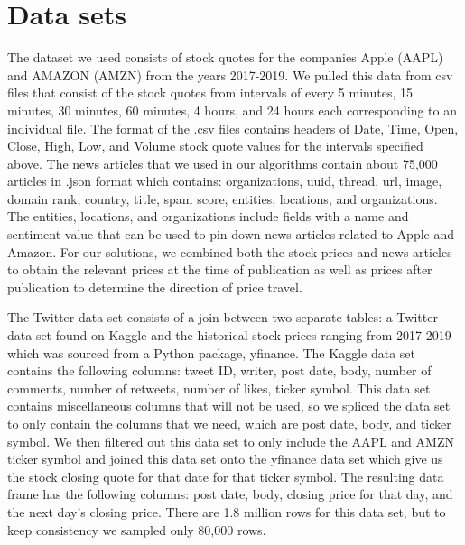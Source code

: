 \documentclass[conference]{IEEEtran}
\begin{document}
\section{Data sets}
The dataset we used consists of stock quotes for the companies Apple (AAPL) and AMAZON (AMZN) from the years 2017-2019. We pulled this data from csv files that consist of the stock quotes from intervals of every 5 minutes, 15 minutes, 30 minutes, 60 minutes, 4 hours, and 24 hours each corresponding to an individual file. The format of the .csv files contains headers of Date, Time, Open, Close, High, Low, and Volume stock quote values for the intervals specified above. The news articles that we used in our algorithms contain about 75,000 articles in .json format which contains: organizations, uuid, thread, url, image, domain rank, country, title, spam score, entities, locations, and organizations. The entities, locations, and organizations include fields with a name and sentiment value that can be used to pin down news articles related to Apple and Amazon.
For our solutions, we combined both the stock prices and news articles to obtain the relevant prices at the time of publication as well as prices after publication to determine the direction of price travel.

The Twitter data set consists of a join between two separate tables: a Twitter data set found on Kaggle and the historical stock prices ranging from 2017-2019 which was sourced from a Python package, yfinance. The Kaggle data set contains the following columns: tweet ID, writer, post date, body, number of comments, number of retweets, number of likes, ticker symbol. This data set contains miscellaneous columns that will not be used, so we spliced the data set to only contain the columns that we need, which are post date, body, and ticker symbol. We then filtered out this data set to only include the AAPL and AMZN ticker symbol and joined this data set onto the yfinance data set which give us the stock closing quote for that date for that ticker symbol. The resulting data frame has the following columns: post date, body, closing price for that day, and the next day's closing price. There are 1.8 million rows for this data set, but to keep consistency we sampled only 80,000 rows.
\end{document}
